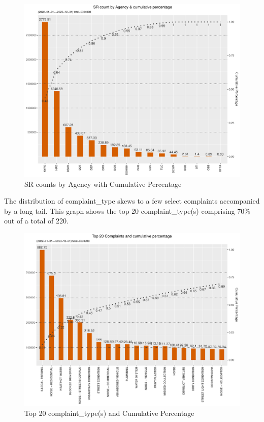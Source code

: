 \documentclass[12pt, titlepage]{article}
\begin{document}
\begin{figure}[tbp]
	\centering
	\includegraphics[width=\textwidth]{SRs_by_Agency.pdf}
  	\caption{SR counts by Agency with Cumulative Percentage}
	\label{fig:SRcountbyAgency}
\end{figure}

The distribution of complaint\_type skews to a few select complaints 
accompanied by a long tail. This graph shows the top 20 complaint\_type(s) 
comprising 70\% out of a total of 220.

\begin{figure}[tbp]
	\centering
 	\includegraphics[width=\textwidth]{SR_by_Complaint_Type.pdf} 
	\caption{Top 20 complaint\_type(s) and Cumulative Percentage} 
	\label{fig:SR_complaints}
\end{figure}
\end{document}
